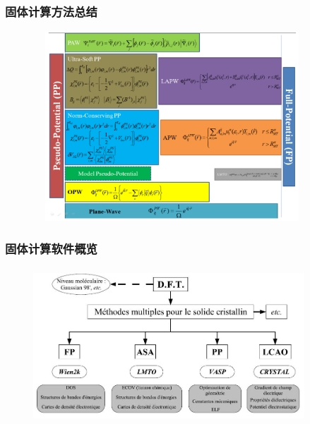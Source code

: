 \frame
{
	\frametitle{固体计算方法总结}
\begin{figure}[h!]
\centering
\vspace*{-0.25in}
\includegraphics[height=2.80in,width=4.10in,viewport=0 0 1150 850,clip]{Figures/Pseudo-Full_Potential-2.png}
\label{Pseudo-Full_Poential}
\end{figure}
}

\frame
{
	\frametitle{固体计算软件概览}
\begin{figure}[h!]
\centering
\vspace*{-0.05in}
\includegraphics[height=2.30in,width=4.00in,viewport=0 0 920 500,clip]{Figures/DFT-Software.jpg}
\label{Abinitio-Softwares}
\end{figure}
}

